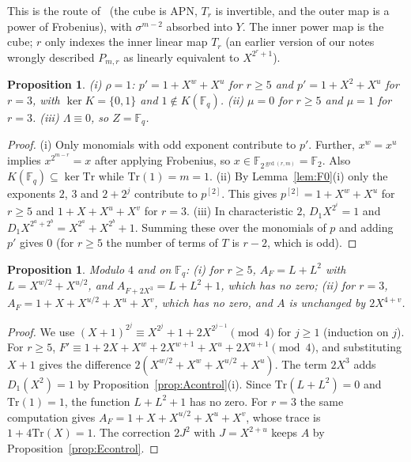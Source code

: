 \documentclass[11pt]{article}
\newtheorem{proposition}[theorem]{Proposition}
\theoremstyle{definition}
\theoremstyle{remark}
\newcommand{\F}{\mathbb{F}}
\newcommand{\Tr}{\mathrm{Tr}}
\begin{document}
This is the route of~\cite[Thm.~3.1]{Fukui2} (the cube is APN, $T_r$ is invertible, and the outer map is a
power of Frobenius), with $\sigma^{m-2}$ absorbed into $Y$. The inner power map is the cube; $r$ only indexes the inner linear map
$T_r$ (an earlier version of our notes wrongly described $P_{m,r}$ as linearly equivalent to $X^{2^r+1}$).

\begin{proposition}\label{prop:I123}
(i) $\rho=1$: $p'=1+X^w+X^u$ for $r\ge5$ and $p'=1+X^2+X^u$ for $r=3$, with $\ker K=\{0,1\}$ and $1\notin K(\F_q)$.
(ii) $\mu=0$ for $r\ge5$ and $\mu=1$ for $r=3$.
(iii) $\Lambda\equiv0$, so $Z=\F_q$.
\end{proposition}
\begin{proof}
(i) Only monomials with odd exponent contribute to $p'$. Further, $x^w=x^u$ implies $x^{2^{m-r}}=x$ after applying Frobenius,
so $x\in\F_{2^{\gcd(r,m)}}=\F_2$. Also $K(\F_q)\subseteq\ker\Tr$ while $\Tr(1)=m=1$.
(ii) By Lemma~\ref{lem:F0}(i) only the exponents $2$, $3$ and $2+2^j$ contribute to $p^{[2]}$. This gives
$p^{[2]}=1+X^w+X^u$ for $r\ge5$ and $1+X+X^u+X^v$ for $r=3$.
(iii) In characteristic $2$, $D_1X^{2^i}=1$ and $D_1X^{2^a+2^b}=X^{2^a}+X^{2^b}+1$. Summing these over the
monomials of $p$ and adding $p'$ gives $0$ (for $r\ge5$ the number of terms of $T$ is $r-2$, which is odd).
\end{proof}

\begin{proposition}\label{prop:I45}
Modulo $4$ and on $\F_q$:
(i) for $r\ge5$, $A_F=L+L^2$ with $L=X^{w/2}+X^{u/2}$, and $A_{F+2X^3}=L+L^2+1$, which has no zero;
(ii) for $r=3$, $A_F=1+X+X^{u/2}+X^u+X^v$, which has no zero, and $A$ is unchanged by $2X^{4+v}$.
\end{proposition}
\begin{proof}
We use $(X+1)^{2^j}\equiv X^{2^j}+1+2X^{2^{j-1}}\pmod 4$ for $j\ge1$ (induction on $j$). For $r\ge5$,
$F'\equiv1+2X+X^w+2X^{w+1}+X^u+2X^{u+1}\pmod4$, and substituting $X+1$ gives the difference
$2(X^{w/2}+X^w+X^{u/2}+X^u)$. The term $2X^3$ adds $D_1(X^2)=1$ by Proposition~\ref{prop:Acontrol}(i). Since
$\Tr(L+L^2)=0$ and $\Tr(1)=1$, the function $L+L^2+1$ has no zero. For $r=3$ the same computation gives
$A_F=1+X+X^{u/2}+X^u+X^v$, whose trace is $1+4\Tr(X)=1$. The correction $2J^2$ with $J=X^{2+u}$ keeps $A$ by
Proposition~\ref{prop:Econtrol}.
\end{proof}
\end{document}
